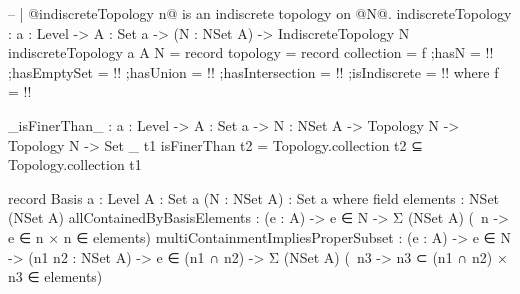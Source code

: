 \begin{code}
-- | @indiscreteTopology n@ is an indiscrete topology on @N@.
indiscreteTopology : {a : Level} ->
                     {A : Set a} ->
                     (N : NSet A) ->
                     IndiscreteTopology N
indiscreteTopology {a} {A} N = record
  {topology = record
     {collection = f
     ;hasN = {!!}
     ;hasEmptySet = {!!}
     ;hasUnion = {!!}
     ;hasIntersection = {!!}
     }
  ;isIndiscrete = {!!}}
  where
  f = {!!}
  
_isFinerThan_ : {a : Level} ->
                {A : Set a} ->
                {N : NSet A} ->
                Topology N ->
                Topology N ->
                Set _
t1 isFinerThan t2 = Topology.collection t2 ⊆ Topology.collection t1

record Basis {a : Level} {A : Set a} (N : NSet A) : Set a where
  field
   elements : NSet (NSet A)
   allContainedByBasisElements :
     (e : A) ->
     e ∈ N ->
     Σ (NSet A) (\ n -> e ∈ n × n ∈ elements)
   multiContainmentImpliesProperSubset :
     (e : A) ->
     e ∈ N ->
     (n1 n2 : NSet A) ->
     e ∈ (n1 ∩ n2) ->
     Σ (NSet A) (\ n3 -> n3 ⊂ (n1 ∩ n2) × n3 ∈ elements)
\end{code}
